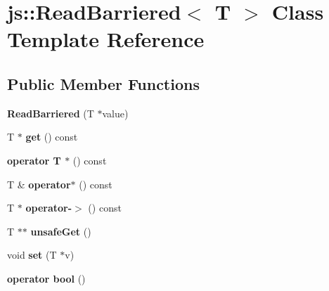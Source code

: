 \hypertarget{classjs_1_1_read_barriered}{\section{js\-:\-:Read\-Barriered$<$ T $>$ Class Template Reference}
\label{classjs_1_1_read_barriered}
}
\subsection*{Public Member Functions}
\begin{DoxyCompactItemize}
\item 
\hypertarget{classjs_1_1_read_barriered_a57873be4b9861d905bbe212231a791c9}{{\bfseries Read\-Barriered} (T $\ast$value)}\label{classjs_1_1_read_barriered_a57873be4b9861d905bbe212231a791c9}

\item 
\hypertarget{classjs_1_1_read_barriered_a6912516519bd91f86f81eab8f7c070d3}{T $\ast$ {\bfseries get} () const }\label{classjs_1_1_read_barriered_a6912516519bd91f86f81eab8f7c070d3}

\item 
\hypertarget{classjs_1_1_read_barriered_af399bc144fead397e1e7757f1ecdb153}{{\bfseries operator T $\ast$} () const }\label{classjs_1_1_read_barriered_af399bc144fead397e1e7757f1ecdb153}

\item 
\hypertarget{classjs_1_1_read_barriered_a0fa4e24e8e27d52887fa5de2f695f5d5}{T \& {\bfseries operator$\ast$} () const }\label{classjs_1_1_read_barriered_a0fa4e24e8e27d52887fa5de2f695f5d5}

\item 
\hypertarget{classjs_1_1_read_barriered_aa23c89e4c8bd143a25eb1fc95e84f147}{T $\ast$ {\bfseries operator-\/$>$} () const }\label{classjs_1_1_read_barriered_aa23c89e4c8bd143a25eb1fc95e84f147}

\item 
\hypertarget{classjs_1_1_read_barriered_ab720165d470827ad56bb900e12e36931}{T $\ast$$\ast$ {\bfseries unsafe\-Get} ()}\label{classjs_1_1_read_barriered_ab720165d470827ad56bb900e12e36931}

\item 
\hypertarget{classjs_1_1_read_barriered_a1bca3b2fef4485b46bcbd4f1ccd3f63c}{void {\bfseries set} (T $\ast$v)}\label{classjs_1_1_read_barriered_a1bca3b2fef4485b46bcbd4f1ccd3f63c}

\item 
\hypertarget{classjs_1_1_read_barriered_a0c3012c6ed1f86ddb63880f3a7ab54a7}{{\bfseries operator bool} ()}\label{classjs_1_1_read_barriered_a0c3012c6ed1f86ddb63880f3a7ab54a7}


\end{DoxyCompactItemize}
